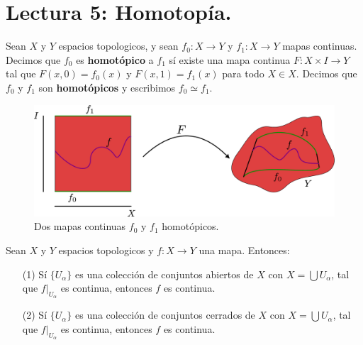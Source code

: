 \section*{Lectura 5: Homotop\'ia.}

\begin{definition}
    Sean $X$ y  $Y$ espacios topologicos, y sean  $f_0:X \xrightarrow{} Y$ y
    $f_1:X \xrightarrow{} Y$ mapas continuas. Decimos que $f_0$ es
    \textbf{homot\'opico} a $f_1$ s\'i existe una mapa continua $F:X \times I
    \xrightarrow{} Y$ tal que $F(x,0)=f_0(x)$ y $F(x,1)=f_1(x)$ para todo $X \in
    X$. Decimos que  $f_0$ y $f_1$ son \textbf{homot\'opicos} y escribimos $f_0
    \simeq f_1$.
\end{definition}

\begin{figure}[h]
    \centering
    \includegraphics[scale=0.2]{Figures/homotopia.eps}
    \caption{Dos mapas continuas $f_0$ y $f_1$ homot\'opicos.}
    \label{fig_13}
\end{figure}

\begin{theorem}\label{thm_5.6}
    Sean $X$ y  $Y$ espacios topologicos y  $f:X \xrightarrow{} Y$ una mapa.
    Entonces:
    \begin{enumerate}
        \item[(1)] S\'i $\{U_\alpha\}$ es una colecci\'on de conjuntos abiertos
            de $X$ con  $X=\bigcup{U_\alpha}$, tal que $f|_{U_\alpha}$ es
            continua, entonces $f$ es continua.

        \item[(2)] S\'i $\{U_\alpha\}$ es una colecci\'on de conjuntos cerrados
            de $X$ con  $X=\bigcup{U_\alpha}$, tal que $f|_{U_\alpha}$ es
            continua, entonces $f$ es continua.
    \end{enumerate}
\end{theorem}


